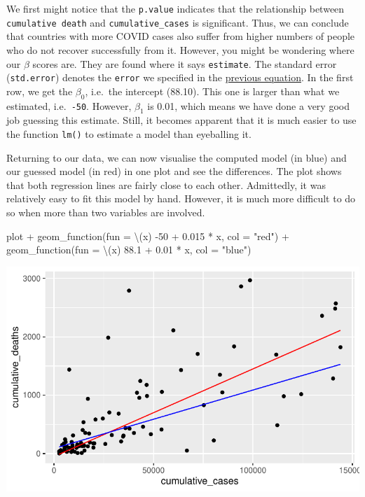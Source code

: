 \documentclass[
  letterpaper,
  DIV=11,
  numbers=noendperiod]{scrreprt}
\newenvironment{Shaded}{\begin{snugshade}}{\end{snugshade}}
\newcommand{\AttributeTok}[1]{\textcolor[rgb]{0.40,0.45,0.13}{#1}}
\newcommand{\DecValTok}[1]{\textcolor[rgb]{0.68,0.00,0.00}{#1}}
\newcommand{\FloatTok}[1]{\textcolor[rgb]{0.68,0.00,0.00}{#1}}
\newcommand{\FunctionTok}[1]{\textcolor[rgb]{0.28,0.35,0.67}{#1}}
\newcommand{\NormalTok}[1]{\textcolor[rgb]{0.00,0.23,0.31}{#1}}
\newcommand{\SpecialCharTok}[1]{\textcolor[rgb]{0.37,0.37,0.37}{#1}}
\newcommand{\StringTok}[1]{\textcolor[rgb]{0.13,0.47,0.30}{#1}}
\begin{document}
We first might notice that the \texttt{p.value} indicates that the
relationship between \texttt{cumulative\ death} and
\texttt{cumulative\_cases} is significant. Thus, we can conclude that
countries with more COVID cases also suffer from higher numbers of
people who do not recover successfully from it. However, you might be
wondering where our \(\beta\) scores are. They are found where it says
\texttt{estimate}. The standard error (\texttt{std.error}) denotes the
\texttt{error} we specified in the
\hyperref[single-linear-regression]{previous equation}. In the first
row, we get the \(\beta_0\), i.e.~the intercept (88.10). This one is
larger than what we estimated, i.e.~\texttt{-50}. However, \(\beta_1\)
is 0.01, which means we have done a very good job guessing this
estimate. Still, it becomes apparent that it is much easier to use the
function \texttt{lm()} to estimate a model than eyeballing it.

Returning to our data, we can now visualise the computed model (in blue)
and our guessed model (in red) in one plot and see the differences. The
plot shows that both regression lines are fairly close to each other.
Admittedly, it was relatively easy to fit this model by hand. However,
it is much more difficult to do so when more than two variables are
involved.

\begin{Shaded}
\begin{Highlighting}[]
\NormalTok{plot }\SpecialCharTok{+}
  \FunctionTok{geom\_function}\NormalTok{(}\AttributeTok{fun =}\NormalTok{ \textbackslash{}(x) }\SpecialCharTok{{-}}\DecValTok{50} \SpecialCharTok{+} \FloatTok{0.015} \SpecialCharTok{*}\NormalTok{ x, }\AttributeTok{col =} \StringTok{"red"}\NormalTok{) }\SpecialCharTok{+}
    \FunctionTok{geom\_function}\NormalTok{(}\AttributeTok{fun =}\NormalTok{ \textbackslash{}(x) }\FloatTok{88.1} \SpecialCharTok{+} \FloatTok{0.01} \SpecialCharTok{*}\NormalTok{ x, }\AttributeTok{col =} \StringTok{"blue"}\NormalTok{)}
\end{Highlighting}
\end{Shaded}

\includegraphics{13_regressions_files/figure-latex/comparing-computed-vs-hand-fitted-1.pdf}
\end{document}
